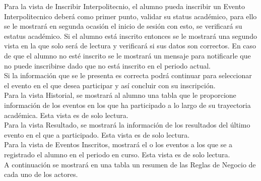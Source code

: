 	Para la vista de Inscribir Interpolitecnio, el alumno pueda inscribir un Evento Interpolitecnico deberá como primer punto, validar su status académico, para ello se le mostrará en segunda ocasión el inicio de sesión con esto, se verificará su estatus académico. Si el alumno está inscrito entonces se le mostrará una segundo vista en la que solo será de lectura y verificará si sus datos son correctos. En caso de que el alumno no esté inscrito se le mostrará un mensaje para notificarle que no puede inscribirse dado que no está inscrito en el periodo actual. \\
	Si la información que se le presenta es correcta podrá continuar para seleccionar el evento en el que desea participar y así concluir con su inscripción. \\
	
	Para la vista Historial, se mostrará al alumno una tabla que le proporcione información de los eventos en los que ha participado a lo largo de su trayectoria académica. Esta vista es de solo lectura.\\
	
	Para la vista Resultado, se mostrará la información de los resultados del último evento en el que a participado. Esta vista es de solo lectura.\\
	
	Para la vista de Eventos Inscritos, mostrará el o los eventos a los que se a registrado el alumno en el periodo en curso. Esta vista es de solo lectura.\\
	
	\noindent A continuación se mostrará en una tabla un resumen de las Reglas de Negocio de cada uno de los actores.
	
